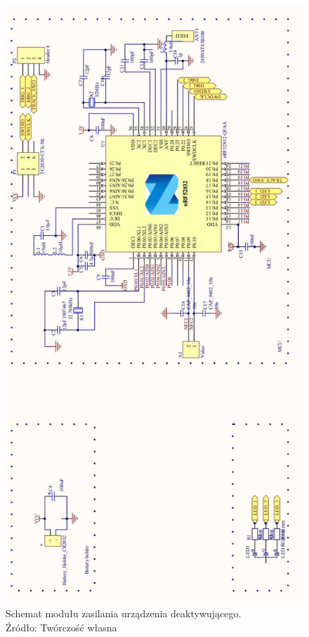 \begin{figure}[h]
	\centering
	\includegraphics[width=12cm]{img/schematics/keytag.jpg}
	\caption{Schemat modułu zasilania urządzenia deaktywującego. \\ Źródło: Twórczość własna}
	\label{fig:image_keytag_schematic}
\end{figure}
